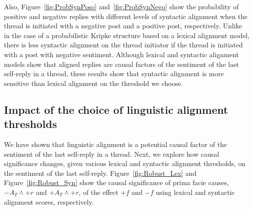 \documentclass[man,biblatex,floatsintext]{apa6}
\begin{document}
Also, Figure~\ref{fig:ProbSynPoso} and~\ref{fig:ProbSynNego} show the probability of positive and negative replies with different levels of syntactic alignment when the thread is initiated with a negative post and a positive post, respectively. Unlike in the case of a probabilistic Kripke structure based on a lexical alignment model, there is less syntactic alignment on the thread initiator if the thread is initiated with a post with negative sentiment. Although lexical and syntactic alignment models show that aligned replies are causal factors of the sentiment of the last self-reply in a thread, these results show that syntactic alignment is more sensitive than lexical alignment on the threshold we choose.




\subsection{Impact of the choice of linguistic alignment thresholds}

We have shown that linguistic alignment is a potential causal factor of the sentiment of the last self-reply in a thread. Next, we explore how causal significance changes, given various lexical and syntactic alignment thresholds, on the sentiment of the last self-reply. Figure~\ref{fig:Robust_Lex} and Figure~\ref{fig:Robust_Syn} show the causal significance of prima facie causes, $-A_T \wedge +r$ and $+A_T \wedge +r$, of the effect $+f$ and $-f$ using lexical and syntactic alignment scores, respectively.
\end{document}
